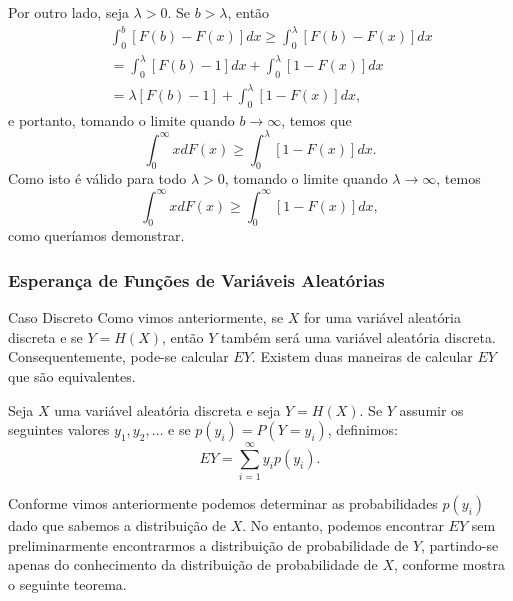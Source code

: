 \begin{frame}

Por outro lado, seja $\lambda>0$. Se $b>\lambda$, então
\begin{eqnarray}
& & \int_{0}^{b}[F(b)-F(x)]dx\geq \int_{0}^{\lambda}[F(b)-F(x)]dx\nonumber \\
& &  =\int_{0}^{\lambda}[F(b)-1]dx+\int_{0}^{\lambda}[1-F(x)]dx \nonumber \\ & & =\lambda[F(b)-1]+\int_{0}^{\lambda}[1-F(x)]dx, \nonumber
\end{eqnarray}
e portanto, tomando o limite quando $b\rightarrow\infty$, temos que
$$\int_{0}^{\infty}xdF(x)\geq\int_{0}^{\lambda}[1-F(x)]dx.$$
Como isto é válido para todo $\lambda>0$, tomando o limite quando $\lambda\rightarrow\infty$, temos
$$\int_{0}^{\infty}xdF(x)\geq\int_{0}^{\infty}[1-F(x)]dx,$$
como queríamos demonstrar.

\end{frame}
%
\begin{frame}
\frametitle{Esperança de Funções de Variáveis Aleatórias}
\begin{block}{Caso Discreto}
%
Como vimos anteriormente, se $X$ for uma variável aleatória discreta
e se $Y=H(X)$, então $Y$ também será uma variável aleatória
discreta. Consequentemente, pode-se calcular $EY$. Existem duas
maneiras de calcular $EY$ que são equivalentes.
\end{block}
\begin{defi}
Seja $X$ uma variável aleatória discreta e seja $Y=H(X)$. Se $Y$
assumir os seguintes valores $y_1,y_2,\ldots$  e se
$p(y_i)=P(Y=y_i)$, definimos: $$EY=\sum_{i=1}^{\infty}y_ip(y_i).$$
\end{defi}
%
%
%
Conforme vimos anteriormente podemos determinar as
probabilidades $p(y_i)$ dado que sabemos a distribuição de $X$. No
entanto, podemos encontrar $EY$ sem preliminarmente encontrarmos a
distribuição de probabilidade de $Y$, partindo-se apenas do
conhecimento da distribuição de probabilidade de $X$, conforme
mostra o seguinte teorema.
%
%
\end{frame}
